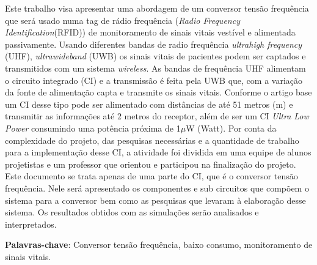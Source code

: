 \begin{resumo}


Este trabalho visa apresentar uma abordagem de um conversor tensão frequência que será usado numa tag de rádio frequência (\textit{Radio Frequency Identification}(RFID)) de monitoramento de sinais vitais vestível e alimentada passivamente. Usando diferentes bandas de radio frequência \textit{ultrahigh frequency} (UHF), \textit{ultrawideband} (UWB) os sinais vitais de pacientes podem ser captados e transmitidos com um sistema \textit{wireless}. As bandas de frequência UHF alimentam o circuito integrado (CI) e a transmissão é feita pela UWB que, com a variação da fonte de alimentação capta e transmite os sinais vitais.
Conforme o artigo base\cite{artigo_principal} um CI desse tipo pode ser alimentado com distâncias de até 51 metros (m) e transmitir as informações até 2 metros do receptor, além de ser um CI \textit{Ultra Low Power} consumindo uma potência próxima de 1$\mu$W (Watt). Por conta da complexidade do projeto, das pesquisas necessárias e a quantidade de  trabalho para a implementação desse CI, a atividade foi dividida em uma equipe de alunos projetistas e um professor que orientou e participou na finalização do projeto. Este documento se trata apenas de uma parte do CI, que é o conversor tensão frequência. Nele será apresentado os componentes e sub circuitos que compõem o sistema para a conversor bem como as pesquisas que levaram à elaboração desse sistema. Os resultados obtidos com as simulações serão analisados e interpretados.






 \vspace{\onelineskip}
    
 \noindent
 \textbf{Palavras-chave}: Conversor tensão frequência, baixo consumo, monitoramento de sinais vitais.
\end{resumo}
